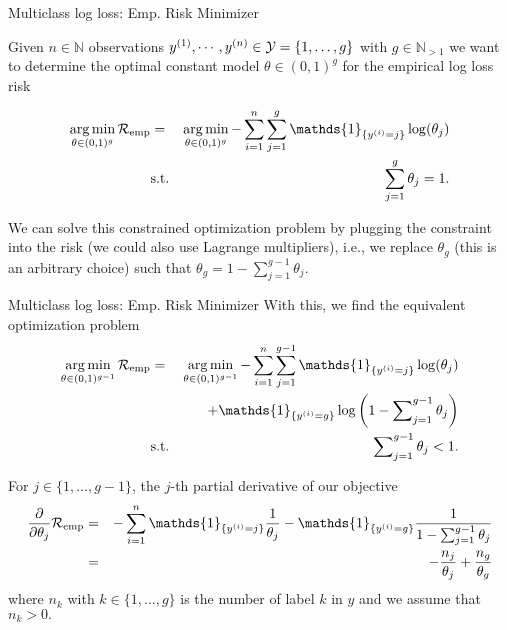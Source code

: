 \documentclass[11pt,compress,t,notes=noshow, xcolor=table]{beamer}
\newcommand{\argminl}{\mathop{\operatorname{arg\,min}}\limits}
\begin{document}
\begin{vbframe}{Multiclass log loss: Emp. Risk Minimizer}

Given $n \in \mathbb{N}$ observations $y^{(1)}, \cdots, y^{(n)} \in \mathcal{Y} = \{1, \dots, g\}$ with $g\in\mathbb{N}_{>1}$ we want to determine the optimal constant model $\theta \in (0,1)^g$ for the empirical log loss risk

\begin{eqnarray*}
  \argminl_{\theta \in (0, 1)^g}\riske   &=& 
  \argminl_{\theta \in (0, 1)^g}-\sum^n_{i=1}\sum^g_{j=1} \mathds{1}_{\{y^{(i)} = j\}}\log(\theta_j) \\
  &\text{s.t.}& \sum^g_{j=1}\theta_j = 1.
\end{eqnarray*}

We can solve this constrained optimization problem by plugging the constraint into the risk (we could also use Lagrange multipliers), i.e., we replace $\theta_g$ (this is an arbitrary choice) such that $
 \theta_g = 1 - \sum^{g-1}_{j=1}\theta_j.
$

\end{vbframe}
\begin{vbframe}{Multiclass log loss: Emp. Risk Minimizer}
With this, we find the equivalent optimization problem
\begin{eqnarray*}
  \argminl_{\theta \in (0, 1)^{g-1}}\riske  & = & \argminl_{\theta \in (0, 1)^{g-1}}
  -\sum^n_{i=1}\sum^{g-1}_{j=1} \mathds{1}_{\{y^{(i)} = j\}}\log(\theta_j) \\ 
  &&+ \mathds{1}_{\{y^{(i)} = g\}}\log\left(1 - \sum\nolimits^{g-1}_{j=1}\theta_j\right) \\
  &\text{s.t.}&  \sum\nolimits^{g-1}_{j=1}\theta_j < 1.
\end{eqnarray*}

For $j \in \{1,\dots,g-1\}$, the $j$-th partial derivative of our objective 
\begin{eqnarray*}
 \frac{\partial}{\partial \theta_j}\riske  & = & 
  -\sum^n_{i=1} \mathds{1}_{\{y^{(i)} = j\}}\frac{1}{\theta_j} - \mathds{1}_{\{y^{(i)} = g\}}\frac{1}{1 - \sum^{g-1}_{j=1}\theta_j} \\
  & = & -\frac{n_j}{\theta_j} + \frac{n_g}{\theta_g}
\end{eqnarray*}
where $n_k$ with $k\in \{1,\dots, g\}$ is the number of label $k$ in $y$ and we assume that $n_k > 0.$

\end{vbframe}
\end{document}
